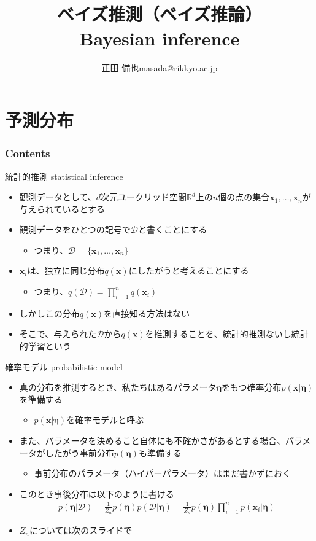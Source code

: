 \documentclass[aspectratio=169,unicode,dvipdfmx,14pt]{beamer}
\title{ \\ベイズ推測（ベイズ推論）\\ Bayesian inference}
\author{\texorpdfstring{正田 備也\newline\href{mailto:masada@rikkyo.ac.jp}{masada@rikkyo.ac.jp}}{正田 備也}}
\date{}
\begin{document}
\begin{frame}
\titlepage
\end{frame}

\section{予測分布}

\begin{frame}\frametitle{Contents}
\Large \tableofcontents[currentsection]
\end{frame}

\begin{frame}{統計的推測 statistical inference}
\begin{itemize}
\item 観測データとして、$d$次元ユークリッド空間$\mathbb{R}^d$上の$n$個の点の集合$\bm{x}_1,\ldots,\bm{x}_n$が与えられているとする
\item 観測データをひとつの記号で$\mathcal{D}$と書くことにする
\begin{itemize}
\item つまり、$\mathcal{D}=\{ \bm{x}_1,\ldots,\bm{x}_n \}$
\end{itemize}
\item $\bm{x}_i$は、独立に同じ分布$q(\bm{x})$にしたがうと考えることにする
\begin{itemize}
\item つまり、$q(\mathcal{D}) = \prod_{i=1}^n q(\bm{x}_i)$
\end{itemize}
\item しかしこの分布$q(\bm{x})$を直接知る方法はない
\item そこで、与えられた$\mathcal{D}$から$q(\bm{x})$を推測することを、統計的推測ないし統計的学習という
\end{itemize}
\end{frame}

\begin{frame}{確率モデル probabilistic model}
\begin{itemize}
\item 真の分布を推測するとき、私たちはあるパラメータ$\bm{\eta}$をもつ確率分布$p(\bm{x}|\bm{\eta})$を準備する
\begin{itemize}
\item $p(\bm{x}|\bm{\eta})$を確率モデルと呼ぶ
\end{itemize}
\item また、パラメータを決めること自体にも不確かさがあるとする場合、パラメータがしたがう事前分布$p(\bm{\eta})$も準備する
\begin{itemize}
\item 事前分布のパラメータ（ハイパーパラメータ）はまだ書かずにおく
\end{itemize}
\item このとき事後分布は以下のように書ける
\begin{align}
p(\bm{\eta} | \mathcal{D}) = \frac{1}{Z_n} p(\bm{\eta}) p(\mathcal{D}|\bm{\eta})
= \frac{1}{Z_n} p(\bm{\eta}) \prod_{i=1}^n p(\bm{x}_i | \bm{\eta})
\label{eq:posterior}
\end{align}
\item $Z_n$については次のスライドで
\end{itemize}
\end{frame}
\end{document}
